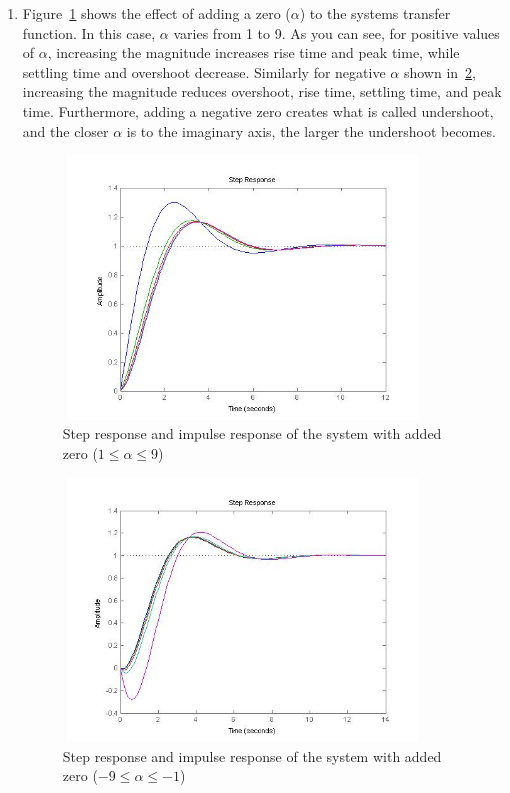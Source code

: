 \documentclass[letterpaper, 11pt, openany]{book}
\begin{document}
\begin{enumerate}
\item Figure~\ref{fig:VaryAlphaPos} shows the effect of adding a zero ($\alpha$) to the systems transfer function. 
In this case, $\alpha$ varies from 1 to 9. As you can see, for positive values of $\alpha$, increasing the magnitude 
increases rise time and peak time, while settling time and overshoot decrease. Similarly for negative $\alpha$ shown 
in~\ref{fig:VaryAlphaNeg}, increasing the magnitude reduces overshoot, rise time, settling time, and peak time. 
Furthermore, adding a negative zero creates what is called undershoot, and the closer $\alpha$ is to the imaginary 
axis, the larger the undershoot becomes. 

\begin{figure}[htbp]
\centering
\includegraphics[width=0.9\textwidth, height = 7cm]{graphics/VaryAlphaPos.jpg} 
\caption{Step response and impulse response of the system with added zero ($1 \leq \alpha \leq 9$)}\label{fig:VaryAlphaPos}
\end{figure}

\begin{figure}[htbp]
\centering
\includegraphics[width=0.9\textwidth, height = 7cm]{graphics/VaryAlphaNeg.jpg} 
\caption{Step response and impulse response of the system with added zero ($-9 \leq \alpha \leq -1$)}\label{fig:VaryAlphaNeg}
\end{figure}


\end{enumerate}
\end{document}
